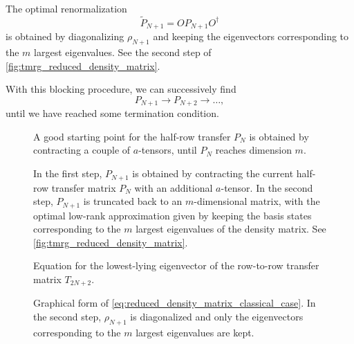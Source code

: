 The optimal renormalization
\begin{equation}
  \widetilde{P}_{N+1} = O P_{N + 1} O^{\dagger}
\end{equation}
is obtained by diagonalizing $\rho_{N + 1}$ and keeping the eigenvectors corresponding
to the $m$ largest eigenvalues. See the second step of \autoref{fig:tmrg_reduced_density_matrix}.

With this blocking procedure, we can successively find
\begin{equation}
    P_{N + 1} \rightarrow P_{N + 2} \rightarrow \dots,
\end{equation}
until we have reached some termination condition.

\begin{figure}
  
  \caption{A good starting point for the half-row transfer $P_N$ is obtained by
  contracting a couple of $a$-tensors, until $P_N$ reaches dimension $m$.}
  \label{fig:tmrg_initial_half_row_transfer_matrix}
\end{figure}

\begin{figure}
  
  \caption{In the first step, $P_{N + 1}$ is obtained by contracting the current half-row
  transfer matrix $P_N$ with an additional $a$-tensor.
  In the second step, $P_{N + 1}$ is truncated back to an $m$-dimensional matrix, with the
  optimal low-rank approximation given by keeping the basis states corresponding to the
  $m$ largest eigenvalues of the density matrix. See
  \autoref{fig:tmrg_reduced_density_matrix}. }
  \label{fig:tmrg_add_site_and_renormalize}
\end{figure}

\begin{figure}
  
  \caption{Equation for the lowest-lying eigenvector of the row-to-row transfer matrix $T_{2N +
  2}$.}
  \label{fig:tmrg_eigenvalue_equation}
\end{figure}

\begin{figure}
  
  \caption{Graphical form of
  \autoref{eq:reduced_density_matrix_classical_case}.
  In the second step, $\rho_{N + 1}$ is diagonalized and only the eigenvectors
  corresponding to the $m$ largest eigenvalues are kept.
  }
  \label{fig:tmrg_reduced_density_matrix}
\end{figure}

